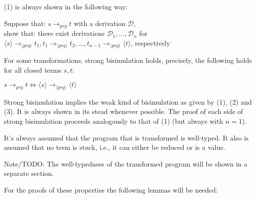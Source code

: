 \documentclass[11pt]{article} %
\begin{document}
(1) is always shown in the following way:

Suppose that: $s \longrightarrow_{prg} t$ with a derivation $\mathcal{D}$, \\
show that: there exist derivations $\mathcal{D}_1, ..., \mathcal{D}_n$ for $\langle s \rangle \longrightarrow_{\langle prg \rangle} t_1, t_1 \longrightarrow_{\langle prg \rangle} t_2, ..., t_{n-1} \longrightarrow_{\langle prg \rangle} \langle t \rangle$, respectively

For some transformations, strong bisimulation holds, precisely, the following holds for all closed terms $s, t$:

$ s \longrightarrow_{prg} t \iff \langle s \rangle \longrightarrow_{\langle prg \rangle} \langle t \rangle$

Strong bisimulation implies the weak kind of bisimulation as given by (1), (2) and (3). It is always shown in its stead whenever possible. The proof of each side of strong bisimulation proceeds analogously to that of (1) (but always with $n = 1$).

It's always assumed that the program that is transformed is well-typed. It also is assumed that no term is stuck, i.e., it can either be reduced or is a value.

Note/TODO: The well-typedness of the transformed program will be shown in a separate section.

For the proofs of these properties the following lemmas will be needed:
\end{document}
